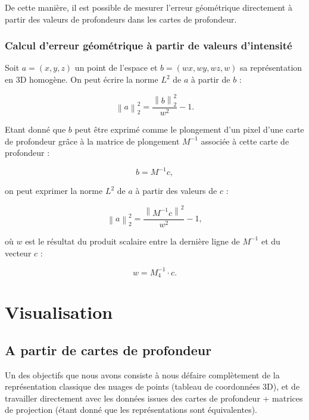 \documentclass{report}
\newcommand{\norm}[1]{\left\lVert#1\right\rVert}
\begin{document}
De cette manière, il est possible de mesurer l'erreur géométrique directement à partir des valeurs de profondeurs dans les cartes de profondeur.

\subsection{Calcul d'erreur géométrique à partir de valeurs d'intensité}

Soit $a = (x,y,z)$ un point de l'espace et $b = (wx,wy,wz,w)$ sa représentation en 3D homogène. On peut écrire la norme $L^2$ de $a$ à partir de $b$ :

\begin{equation}
	\norm{a}_2^2 = \frac{\norm{b}_2^2}{w^2}-1.
\end{equation}

Etant donné que $b$ peut être exprimé comme le plongement d'un pixel d'une carte de profondeur grâce à la matrice de plongement $M^{-1}$ associée à cette carte de profondeur :

\begin{equation}
	b = M^{-1}c,
\end{equation}

on peut exprimer la norme $L^2$ de $a$ à partir des valeurs de $c$ :

\begin{equation}
	\norm{a}_2^2 = \frac{\norm{M^{-1}c}^2}{w^2}-1,
\end{equation}

où $w$ est le résultat du produit scalaire entre la dernière ligne de $M^{-1}$ et du vecteur $c$ :

\begin{equation}
	w = M_4^{-1}\cdot c.
\end{equation}

\chapter{Visualisation}

\section{A partir de cartes de profondeur}

Un des objectifs que nous avons consiste à nous défaire complètement de la représentation classique des nuages de points (tableau de coordonnées 3D), et de travailler directement avec les données issues des cartes de profondeur + matrices de projection (étant donné que les représentations sont équivalentes).
\end{document}
